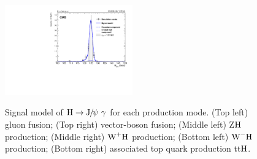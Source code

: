 \begin{figure}[p]
		    \includegraphics[width=0.49\textwidth]{Fig/Fit/signal/SigFit_HJpsiG_ttH_Inclusive}\\
		\caption[Signal_hjpsig]{\label{fig:signal_hjpsig}
		     Signal model of $\mathrm{H}\to{\mathrm{J}\hspace{-.08em}/\hspace{-.14em}\psi}\ \gamma$ for each production mode. (Top left) gluon fusion; (Top right) vector-boson fusion; (Middle left) Z$\mathrm{H}$ production; (Middle right) $\text{W}^{+}\mathrm{H}$ production; (Bottom left) $\text{W}^{-}\mathrm{H}$ production; (Bottom right) associated top quark production tt$\mathrm{H}$. }
		\end{figure}
		
